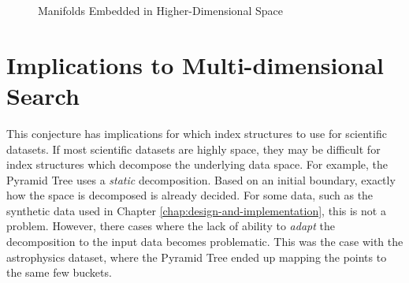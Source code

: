 \begin{figure}
	\caption{Manifolds Embedded in Higher-Dimensional Space}
	\label{fig:manifolds}
\end{figure}

\section{Implications to Multi-dimensional Search}

This conjecture has implications for which index structures to use for scientific datasets. If most scientific datasets are highly space, they may be difficult for index structures which decompose the underlying data space. For example, the Pyramid Tree uses a \textit{static} decomposition. Based on an initial boundary, exactly how the space is decomposed is already decided. For some data, such as the synthetic data used in Chapter \ref{chap:design-and-implementation}, this is not a problem. However, there cases where the lack of ability to \textit{adapt} the decomposition to the input data becomes problematic. This was the case with the astrophysics dataset, where the Pyramid Tree ended up mapping the points to the same few buckets.

